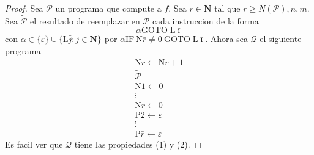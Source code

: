 \begin{frame}

  \begin{proof}
Sea $\mathcal{P}$ un programa que compute a $f$. Sea $r\in \mathbf{N}$ tal
que $r\geq N(\mathcal{P}),n,m$. Sea $\mathcal{\tilde{P}}$ el resultado de
reemplazar en $\mathcal{P}$ cada instruccion de la forma%
\begin{equation*}
\alpha \mathrm{GOTO}\;\mathrm{L}\bar{\imath}
\end{equation*}%
con $\alpha \in \{\varepsilon \}\cup \{\mathrm{L}\bar{j}:j\in \mathbf{N}\}$
por $\alpha \mathrm{IF\ N}\bar{r}\neq 0\ \mathrm{GOTO}\;\mathrm{L}\bar{\imath%
}$. Ahora sea $\mathcal{Q}$ el siguiente programa%
\begin{equation*}
\begin{array}{l}
\mathrm{N}\bar{r}\leftarrow \mathrm{N}\bar{r}+1 \\
\mathcal{\tilde{P}} \\
\mathrm{N}1\leftarrow 0 \\
\vdots  \\
\mathrm{N}\bar{r}\leftarrow 0 \\
\mathrm{P}2\leftarrow \varepsilon  \\
\vdots  \\
\mathrm{P}\bar{r}\leftarrow \varepsilon
\end{array}%
\end{equation*}%
Es facil ver que $\mathcal{Q}$ tiene las propiedades (1) y (2).
\end{proof}

\end{frame}
